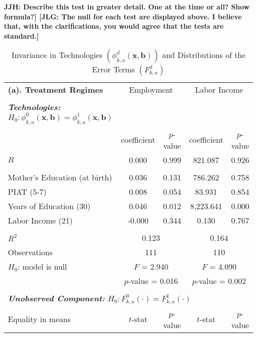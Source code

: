 \noindent \textbf{JJH: Describe this test in greater detail. One at the time or all? Show formula?] [JLG: The null for each test are displayed above. I believe that, with the clarifications, you would agree that the tests are standard.]}

\setcounter{table}{1}

\begin{table}[!htpb]
\begin{threeparttable}
\caption{Invariance in Technologies $ \left( \phi_{k,a}^d \left( \bm{x}, \bm{b} \right) \right) $ and Distributions of the  Error Terms $\left( F_{k,a}^d \right) $} \label{table:invariance}
\centering
\footnotesize
\begin{tabular}{lcccc} \toprule
 \multicolumn{1}{l}{\textbf{(a). Treatment Regimes}} & \multicolumn{2}{c}{Employment} &   \multicolumn{2}{c}{Labor Income} \\ \\
 \textbf{\textit{Technologies:} $H_0: \phi_{k,a}^0 \left( \bm{x}, \bm{b} \right) = \phi_{k,a}^1 \left( \bm{x}, \bm{b} \right)$}      \\
       			      & coefficient & $p$-value & coefficient & $p$-value \\
$R$ &0.000 & 0.999 & 821.087 & 0.926 \\ \\
Mother's Education (at birth) & 0.036 & 0.131 & 786.262 & 0.758 \\
PIAT (5-7) & 0.008 & 0.054 & 83.931 & 0.854 \\
Years of Education (30) & 0.046 & 0.012 & 8,223.641 & 0.000 \\
Labor Income (21) & -0.000 & 0.344 & 0.130 & 0.767 \\ \\
$R^2$ & \multicolumn{2}{c}{0.123}  & \multicolumn{2}{c}{0.164}  \\
Observations & \multicolumn{2}{c}{111} & \multicolumn{2}{c}{110} \\ 
$H_0$: model is null & \multicolumn{2}{c}{$F$ = 2.940} & \multicolumn{2}{c}{$F$ = 4.090} \\ 
& \multicolumn{2}{c}{$p$-value = 0.016} & \multicolumn{2}{c}{$p$-value = 0.002} \\ \\
 \multicolumn{5}{l}{\textbf{\textit{Unobserved Component:} $H_0:  F_{k,a}^0 \left( \cdot \right) =  F_{k,a}^1 \left( \cdot \right)$}} \\  
Equality in means & $t$-stat & $p$-value & $t$-stat & $p$-value \\

\end{tabular}
\end{threeparttable}
\end{table}
